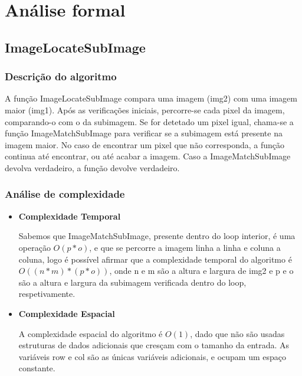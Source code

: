 \section{Análise formal}
\label{sec:imagelocatesubimage/formal}



\subsection{ImageLocateSubImage}

\subsubsection{Descrição do algoritmo}

A função ImageLocateSubImage compara uma imagem (img2) com uma imagem maior (img1). Após as verificações iniciais, percorre-se cada pixel da imagem, comparando-o com o da subimagem. Se for detetado um pixel igual, chama-se a função ImageMatchSubImage para verificar se a subimagem está presente na imagem maior. No caso de encontrar um pixel que não corresponda, a função continua até encontrar, ou até acabar a imagem. Caso a ImageMatchSubImage devolva verdadeiro, a função devolve verdadeiro.

\subsubsection{Análise de complexidade}

\begin{itemize}
    
\item
\textbf{Complexidade Temporal}

Sabemos que ImageMatchSubImage, presente dentro do loop interior, é uma operação $O(p*o)$, e que se percorre a imagem linha a linha e coluna a coluna, logo é possível afirmar que a complexidade temporal do algoritmo é $O((n*m)*(p*o))$, onde n e m são a altura e largura de img2 e p e o são a altura e largura da subimagem verificada dentro do loop, respetivamente.

\item
\textbf{Complexidade Espacial}

A complexidade espacial do algoritmo é $O(1)$, dado que não são usadas estruturas de dados adicionais que cresçam com o tamanho da entrada. As variáveis row e col são as únicas variáveis adicionais, e ocupam um espaço constante.

\end{itemize}
